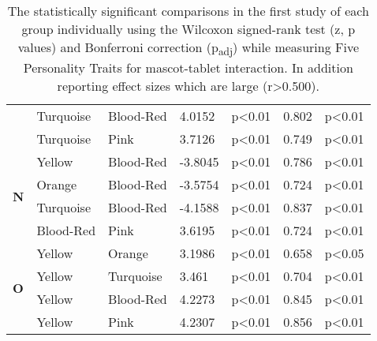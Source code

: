 \begin{table}
\begin{center}
\begin{tabular}{ |p{0.5cm}| p{1.9cm}|p{1.9cm}|p{1.2cm}| p{1.7cm}|p{1cm}|p{1.5cm}|  }
            &Turquoise &Blood-Red &4.0152 &p<0.01 & 0.802 &p<0.01\\
            &Turquoise &Pink &3.7126 &p<0.01 & 0.749 &p<0.01\\
            \hline
            \hline
            \multirow{4}{*}{\textbf{N}}
            &Yellow &Blood-Red &-3.8045 &p<0.01 &0.786 &p<0.01\\
            &Orange &Blood-Red &-3.5754 &p<0.01 &0.724 &p<0.01\\
            &Turquoise &Blood-Red &-4.1588 &p<0.01 &0.837 &p<0.01\\
            &Blood-Red &Pink &3.6195 &p<0.01 &0.724 &p<0.01\\

            \hline
            \hline
            \multirow{4}{*}{\textbf{O}}
            &Yellow &Orange &3.1986 &p<0.01 &0.658 &p<0.05\\
            &Yellow &Turquoise &3.461 &p<0.01 &0.704 &p<0.01\\
            &Yellow &Blood-Red &4.2273 &p<0.01 &0.845 &p<0.01\\
            &Yellow &Pink &4.2307 &p<0.01 &0.856 &p<0.01\\
            \hline
        \end{tabular}
    \end{center}
    \captionsetup{width=13.5cm}
    \caption{The statistically significant comparisons in the first study of each group individually using the Wilcoxon
    signed-rank test (z, p values) and Bonferroni correction (p\textsubscript{adj}) while measuring Five Personality Traits for mascot-tablet interaction.
    In addition reporting effect sizes which are large (r>0.500).}
    \label{table:wilcoxMT1}
\end{table}

